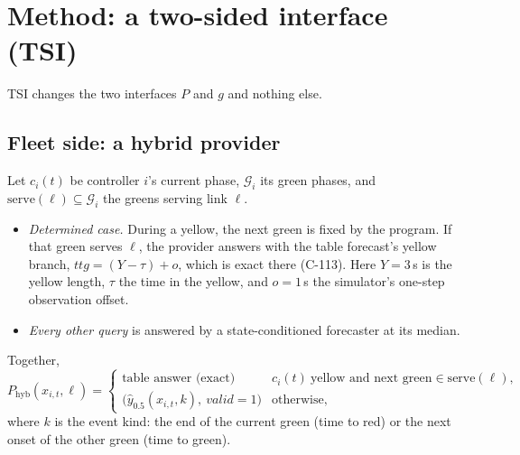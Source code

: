 \documentclass[11pt]{article}
\begin{document}
\section{Method: a two-sided interface (TSI)}\label{sec:method}
TSI changes the two interfaces $P$ and $g$ and nothing else.
\subsection{Fleet side: a hybrid provider}
Let $c_{i}(t)$ be controller $i$'s current phase, $\mathcal G_i$ its green phases, and $\mathrm{serve}(\ell)\subseteq\mathcal G_i$ the
greens serving link $\ell$.
\begin{itemize}\setlength\itemsep{0pt}
\item \emph{Determined case.} During a yellow, the next green is fixed by the program. If that green serves $\ell$, the provider answers
with the table forecast's yellow branch, $\mathit{ttg}=(Y-\tau)+o$, which is exact there (C-113). Here $Y=3$\,s is the yellow length,
$\tau$ the time in the yellow, and $o=1$\,s the simulator's one-step observation offset.
\item \emph{Every other query} is answered by a state-conditioned forecaster at its median.
\end{itemize}
Together,
\begin{equation}
P_{\mathrm{hyb}}(x_{i,t},\ell)=\begin{cases}\text{table answer (exact)} & c_i(t)\ \text{yellow and next green}\in\mathrm{serve}(\ell),\\
\big(\hat y_{0.5}(x_{i,t},k),\ \mathit{valid}=1\big) & \text{otherwise,}\end{cases}
\end{equation}
where $k$ is the event kind: the end of the current green (time to red) or the next onset of the other green (time to green).
\end{document}
